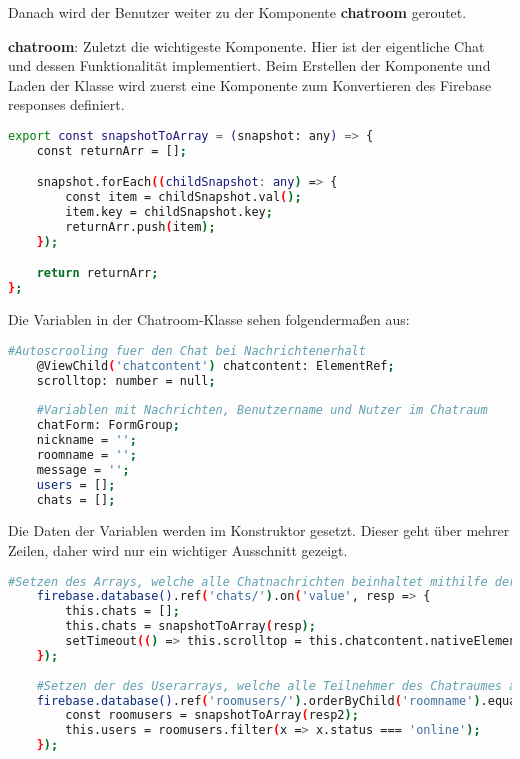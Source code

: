 Danach wird der Benutzer weiter zu der Komponente \textbf{chatroom} geroutet.

\textbf{chatroom}: Zuletzt die wichtigeste Komponente. Hier ist der eigentliche Chat und dessen Funktionalität implementiert. Beim Erstellen der Komponente und Laden der Klasse wird zuerst eine Komponente zum Konvertieren
des Firebase responses definiert.

\begin{lstlisting}[language=bash]
    export const snapshotToArray = (snapshot: any) => {
    const returnArr = [];

    snapshot.forEach((childSnapshot: any) => {
        const item = childSnapshot.val();
        item.key = childSnapshot.key;
        returnArr.push(item);
    });

    return returnArr;
};
\end{lstlisting}

Die Variablen in der Chatroom-Klasse sehen folgendermaßen aus:

\begin{lstlisting}[language=bash]
    #Autoscrooling fuer den Chat bei Nachrichtenerhalt
    @ViewChild('chatcontent') chatcontent: ElementRef;
    scrolltop: number = null;
  
    #Variablen mit Nachrichten, Benutzername und Nutzer im Chatraum
    chatForm: FormGroup;
    nickname = '';
    roomname = '';
    message = '';
    users = [];
    chats = [];
\end{lstlisting}

Die Daten der Variablen werden im Konstruktor gesetzt. Dieser geht über mehrer Zeilen, daher wird nur ein wichtiger Ausschnitt gezeigt.

\begin{lstlisting}[language=bash]
    #Setzen des Arrays, welche alle Chatnachrichten beinhaltet mithilfe der snapshot Konstante
    firebase.database().ref('chats/').on('value', resp => {
        this.chats = [];
        this.chats = snapshotToArray(resp);
        setTimeout(() => this.scrolltop = this.chatcontent.nativeElement.scrollHeight, 500);
    });
    
    #Setzen der des Userarrays, welche alle Teilnehmer des Chatraumes angibt
    firebase.database().ref('roomusers/').orderByChild('roomname').equalTo(this.roomname).on('value', (resp2: any) => {
        const roomusers = snapshotToArray(resp2);
        this.users = roomusers.filter(x => x.status === 'online');
    });
\end{lstlisting}

